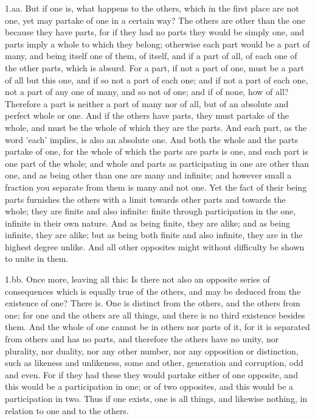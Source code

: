 1.aa. But if one is, what happens to the others, which in the first
place are not one, yet may partake of one in a certain way? The others
are other than the one because they have parts, for if they had no parts
they would be simply one, and parts imply a whole to which they belong;
otherwise each part would be a part of many, and being itself one of
them, of itself, and if a part of all, of each one of the other parts,
which is absurd. For a part, if not a part of one, must be a part of
all but this one, and if so not a part of each one; and if not a part
of each one, not a part of any one of many, and so not of one; and if of
none, how of all? Therefore a part is neither a part of many nor of
all, but of an absolute and perfect whole or one. And if the others have
parts, they must partake of the whole, and must be the whole of which
they are the parts. And each part, as the word 'each' implies, is also
an absolute one. And both the whole and the parts partake of one, for
the whole of which the parts are parts is one, and each part is one part
of the whole; and whole and parts as participating in one are other
than one, and as being other than one are many and infinite; and however
small a fraction you separate from them is many and not one. Yet the
fact of their being parts furnishes the others with a limit towards
other parts and towards the whole; they are finite and also infinite:
finite through participation in the one, infinite in their own nature.
And as being finite, they are alike; and as being infinite, they are
alike; but as being both finite and also infinite, they are in the
highest degree unlike. And all other opposites might without difficulty
be shown to unite in them.

1.bb. Once more, leaving all this: Is there not also an opposite series
of consequences which is equally true of the others, and may be deduced
from the existence of one? There is. One is distinct from the others,
and the others from one; for one and the others are all things, and
there is no third existence besides them. And the whole of one cannot
be in others nor parts of it, for it is separated from others and has
no parts, and therefore the others have no unity, nor plurality, nor
duality, nor any other number, nor any opposition or distinction, such
as likeness and unlikeness, some and other, generation and corruption,
odd and even. For if they had these they would partake either of one
opposite, and this would be a participation in one; or of two opposites,
and this would be a participation in two. Thus if one exists, one is all
things, and likewise nothing, in relation to one and to the others.

